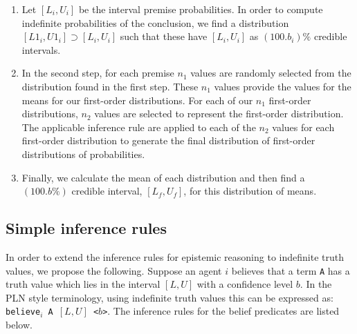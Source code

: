 \documentclass[12pt]{article}
\begin{document}
\begin{enumerate}
\item
Let $[L_i, U_i]$ be the interval premise probabilities. In order to compute indefinite probabilities of the conclusion, we find a distribution $[L1_i,U1_i]\supset [L_i,U_i]$ such that these have $[L_i,U_i]$ as $(100.b_i)\%$ credible intervals.
\item
In the second step, for each premise $n_1$ values are randomly selected from the distribution found in the first step. These $n_1$ values provide the values for the means for our first-order distributions. For each of our $n_1$ first-order distributions, $n_2$ values are selected to represent the first-order distribution. The applicable inference rule are applied  to each of the $n_2$ values for each first-order distribution to generate the final distribution of first-order distributions of probabilities.
\item
 Finally, we calculate the mean of each distribution and then find a $(100.b\%)$ credible interval, $[L_f,U_f]$, for this distribution of means.

\end{enumerate}



\subsection{Simple inference rules} In order to extend the inference rules for epistemic reasoning to indefinite truth values, we propose the following. Suppose an agent $i$ believes that a term \texttt{A} has a truth value which lies in the interval $[L,U]$ with a confidence level $b$. In the PLN style terminology, using indefinite truth values this can be expressed as: \texttt{believe$_i$ A $[L,U]$ <$b$>}. The inference rules for the belief predicates are listed below.
\end{document}
